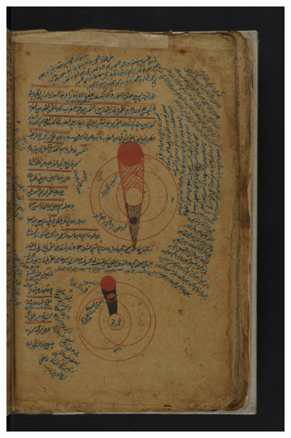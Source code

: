 \begin{figure}[]
\begin{subfigure}[b]{.475\columnwidth}
		\includegraphics[width=\textwidth]{diagrams.jpg}
	\end{subfigure}
	\hfill
	\begin{subfigure}[b]{.475\columnwidth}
		\centering

\end{subfigure}
\end{figure}
